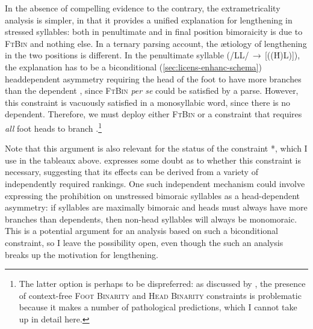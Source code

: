 In the absence of compelling evidence to the contrary, the extrametricality analysis is simpler, in that it provides a unified explanation for lengthening in stressed syllables: both in penultimate and in final position bimoraicity is due to \textsc{FtBin} and nothing else. In a ternary parsing account, the ætiology of lengthening in the two positions is different. In the penultimate syllable (/LL/\,$\rightarrow$\,[((\'H)L)]), the explanation has to be a biconditional (\cref{sec:licens-enhanc-schema}) head\endash dependent asymmetry requiring the head of the foot to have more branches than the dependent \citep{dresher-vdhulst,mellander04:_hl,rice07}, since \textsc{FtBin} \emph{per se} could be satisfied by a \ipa{[(\'LL)]} parse. However, this constraint is vacuously satisfied in a monosyllabic word, since there is no dependent. Therefore, we must deploy either \textsc{FtBin} or a constraint that requires \emph{all} foot heads to branch \citep[\egm][]{rowicka}.\footnote{The latter option is perhaps to be dispreferred: as discussed by \citet{iosad08:_compl}, the presence of context-free \textsc{Foot Binarity} and \textsc{Head Binarity} constraints is problematic because it makes a number of pathological predictions, which I cannot take up in detail here.}

\label{disc-no-bimoraic}Note that this argument is also relevant for the status of the constraint *\mo\mo, which I use in the tableaux above. \citet{moren01:_distin} expresses some doubt as to whether this constraint is necessary, suggesting that its effects can be derived from a variety of independently required rankings. One such independent mechanism could involve expressing the prohibition on unstressed bimoraic syllables as a head\hyp dependent asymmetry: if syllables are maximally bimoraic and heads must always have more branches than dependents, then non\hyp head syllables will always be monomoraic. This is a potential argument for an analysis based on such a biconditional constraint, so I leave the possibility open, even though the such an analysis breaks up the motivation for lengthening.


